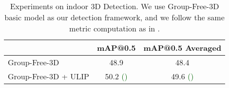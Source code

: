 \documentclass[10pt,twocolumn,letterpaper]{article}
\begin{document}
\begin{table}[htb]
    \small
\centering
    \begin{tabular}{lcc}
         \toprule
~ & mAP@0.5 & mAP@0.5 Averaged
         \\
         \midrule
         Group-Free-3D & 48.9 & 48.4\\
\midrule
         Group-Free-3D + ULIP & 50.2 \textcolor{DarkGreen}{\small ()} & 49.6 \textcolor{DarkGreen}{\small ()}\\
         \bottomrule
    \end{tabular}
\caption{Experiments on indoor 3D Detection. We use Group-Free-3D basic model as our detection framework, and we follow the same metric computation as in \cite{liu2021group}.}
    \label{tab:GroupFree3D experiments}
\end{table}
\end{document}
